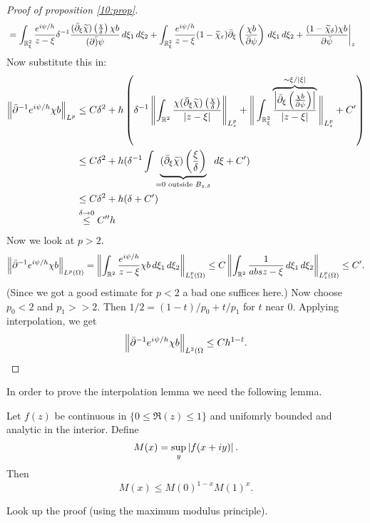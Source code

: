 \begin{proof}[Proof of proposition \ref{10:prop}]
\begin{align*}
  &= \int_{\mathbb{R}_\xi^2}\frac{e^{i\psi/h}}{z-\xi} \delta^{-1} \frac{(\bar{\partial}_\xi\widetilde\chi)\left( \frac\chi\delta \right)\chi b}{(\partial\bar)\psi} \, d\xi_1 \, d\xi_2 + \int_{\mathbb{R}_\xi^2}\frac{e^{i\psi/h}}{z-\xi}(1-\widetilde\chi_\varepsilon)\bar{\partial}_\xi\left( \frac{\chi b}{\bar{\partial}\psi} \right) \, d\xi_1 \, d\xi_2 + \frac{(1-\widetilde\chi_\delta)\chi b}{\partial\bar\psi}\bigg\vert_z 
  \end{align*}
  Now substitute this in:
  \begin{align*}
    \left\lVert \bar{\partial}^{-1} e^{i\psi/h}\chi b \right\rVert_{L^p} &\leq C\delta^2 + h\left( \delta^{-1} \left\lVert  \int_{\mathbb{R}^2} \frac{\chi(\bar{\partial}_\xi\widetilde\chi)\left( \frac\chi\delta \right)}{\left\lvert z-\xi \right\rvert}  \right\rVert_{L_z^p} + \Bigg\Vert \int_{\mathbb{R}_\xi^2} \overbrace{\frac{\left\lvert \bar{\partial}_\xi\left( \frac{\chi b}{\bar{\partial}\psi} \right) \right\rvert}{\left\lvert z-\xi \right\rvert}}^{\sim\xi/\left\lvert \xi \right\rvert} \Bigg\Vert_{L_z^p} + C' \right) \\
    &\leq C\delta^2 + h(\delta^{-1} \int \underbrace{(\bar{\partial}_\xi\widetilde\chi)\left( \frac\xi\delta \right)}_{=0 \text{ outside } B_{z,\delta}} \, d\xi + C') \\
    &\leq C\delta^2+h(\delta+C') \\
    &\overset{\delta\to0}{\leq} C''h
  \end{align*}
  Now we look at $p>2$.
  \[ \left\lVert \bar{\partial}^{-1} e^{i\psi/h}\chi b \right\rVert_{L^p(\Omega)} = \left\lVert  \int_{\mathbb{R}^2} \frac{e^{i\psi/h}}{z-\xi}\chi b \, d\xi_1 \, d\xi_2  \right\rVert_{L_z^p(\Omega)} \leq C \left\lVert  \int_{\mathbb{R}^2} \frac1{abs{z-\xi}}\, d\xi_1 \, d\xi_2  \right\rVert_{L_z^p(\Omega)} \leq C'. \]
  (Since we got a good estimate for $p<2$ a bad one suffices here.)
  Now choose $p_0<2$ and $p_1>>2$.
  Then $1/2=(1-t)/p_0+t/p_1$ for $t$ near $0$.
  Applying interpolation, we get
  \[ \left\lVert \bar{\partial}^{-1} e^{i\psi/h}\chi b \right\rVert_{L^2(\Omega} \leq Ch^{1-t}. \qedhere \]
\end{proof}

In order to prove the interpolation lemma we need the following lemma.

\begin{lem}
  Let $f(z)$ be continuous in $\{0 \leq \Re(z) \leq 1\}$ and unifomrly bounded and analytic in the interior.
  Define
  \[ M(x) = \sup_y \left\lvert f(x+iy) \right\rvert. \]
  Then
  \[ M(x) \leq M(0)^{1-x}M(1)^x. \]
\end{lem}

\begin{exer}
  Look up the proof (using the maximum modulus principle).
\end{exer}


